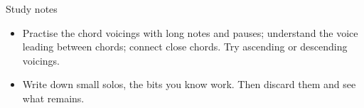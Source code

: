 \begin{study}{Study notes}
\begin{itemize}\setlength{\itemsep}{0pt}
\item Practise the chord voicings with long notes and pauses; understand the voice
  leading between chords; connect close chords. Try ascending or descending voicings.
\item Write down small solos, the bits you know work. Then discard them and see what remains.
\end{itemize}
\end{study}
